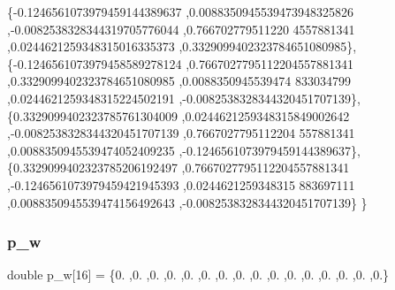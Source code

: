\begin{DoxyCode}
\{-0.1246561073979459144389637 ,0.0088350945539473948325826 ,-0.0082538328344319705776044 ,0.766702779511220
      4557881341 ,0.0244621259348315016335373 ,0.3329099402323784651080985\},
\{-0.1246561073979458589278124 ,0.7667027795112204557881341 ,0.3329099402323784651080985 ,0.0088350945539474
      833034799 ,0.0244621259348315224502191 ,-0.0082538328344320451707139\},
\{0.3329099402323785761304009 ,0.0244621259348315849002642 ,-0.0082538328344320451707139 ,0.7667027795112204
      557881341 ,0.0088350945539474052409235 ,-0.1246561073979459144389637\},
\{0.3329099402323785206192497 ,0.7667027795112204557881341 ,-0.1246561073979459421945393 ,0.0244621259348315
      883697111 ,0.0088350945539474156492643 ,-0.0082538328344320451707139\}
\}
\end{DoxyCode}
\mbox{\label{a00990_a395669ce1fc44c813ffef2d0ee175783}} 
\subsubsection{\texorpdfstring{p\+\_\+w}{p\_w}}
{\footnotesize\ttfamily double p\+\_\+w\mbox{[}16\mbox{]} = \{0. ,0. ,0. ,0. ,0. ,0. ,0. ,0. ,0. ,0. ,0. ,0. ,0. ,0. ,0. ,0.\}}

\mbox{\label{a00990_af2c36e3a386a847b5d91069e6aac0d70}} 

